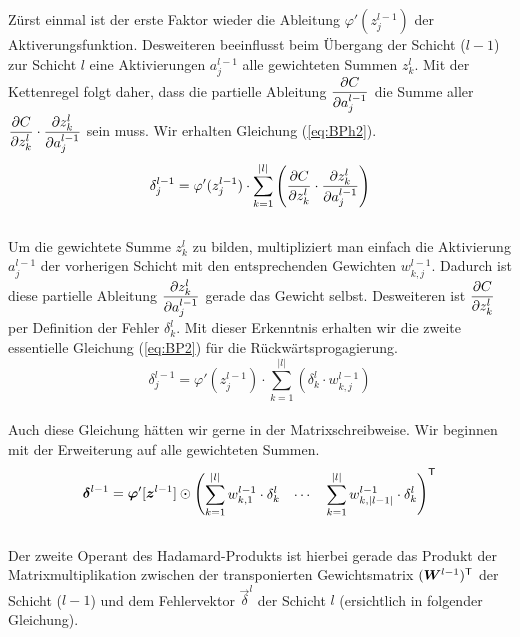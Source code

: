 Zürst einmal ist der erste Faktor wieder die Ableitung $\varphi'(z_j^{l-1})$ der Aktiverungsfunktion.
Desweiteren beeinflusst beim Übergang der Schicht ($l-1$) zur Schicht $l$ eine Aktivierungen
$a_j^{l-1}$ alle gewichteten Summen $z_k^l$. Mit der Kettenregel folgt daher,
dass die partielle Ableitung $\displaystyle\frac{\partial C}{\partial a_j^{l-1}}$ die Summe aller
$\displaystyle\frac{\partial C}{\partial z_k^l} \cdot \displaystyle\frac{\partial z_k^l}{\partial a_j^{l-1}}$ sein muss. Wir
erhalten Gleichung (\ref{eq:BPh2}).
\\
\begin{equation}\label{eq:BPh2}
  \delta_j^{l-1} = \varphi'(z_j^{l-1}) \cdot \sum_{k=1}^{|l|} \left( \frac{\partial C}{\partial z_k^l} \cdot \frac{\partial z_k^l}{\partial a_j^{l-1}} \right)
\end{equation}
\\
Um die gewichtete Summe $z_k^l$ zu bilden, multipliziert man einfach die
Aktivierung $a_j^{l-1}$ der vorherigen Schicht mit den entsprechenden Gewichten $w_{k,j}^{l-1}$.
Dadurch ist diese partielle Ableitung $\displaystyle\frac{\partial z_k^l}{\partial a_j^{l-1}}$ gerade das
Gewicht selbst. Desweiteren ist $\displaystyle\frac{\partial C}{\partial z_k^l}$ per Definition der
Fehler $\delta_k^l$. Mit dieser Erkenntnis erhalten wir die zweite essentielle
Gleichung (\ref{eq:BP2}) für die Rückwärtsprogagierung.
\\
\begin{equation}\tag{BP2}\label{eq:BP2}
  \delta_j^{l-1} = \varphi'(z_j^{l-1}) \cdot \sum_{k=1}^{|l|} \left( \delta_k^l \cdot w_{k,j}^{l-1} \right)
\end{equation}
\\
Auch diese Gleichung hätten wir gerne in der Matrixschreibweise. Wir beginnen
mit der Erweiterung auf alle gewichteten Summen.
\\
\begin{equation*}
  \bm{\delta}^{l-1} = \bm{\varphi}'[\bm{z}^{l-1}] \odot \begin{pmatrix} \displaystyle\sum_{k=1}^{|l|} w_{k,1}^{l-1} \cdot \delta_k^l & \cdots & \displaystyle\sum_{k=1}^{|l|} w_{k,|l-1|}^{l-1} \cdot \delta_k^l \end{pmatrix}^{\mathsf{T}}
\end{equation*}
\\
Der zweite Operant des Hadamard-Produkts ist hierbei gerade das Produkt der
Matrixmultiplikation zwischen
der transponierten Gewichtsmatrix $(\bm{W}^{l-1})^{\mathsf{T}}$ der Schicht ($l-1$)
und dem Fehlervektor $\vec{\delta}^l$ der Schicht $l$ (ersichtlich in folgender Gleichung).

